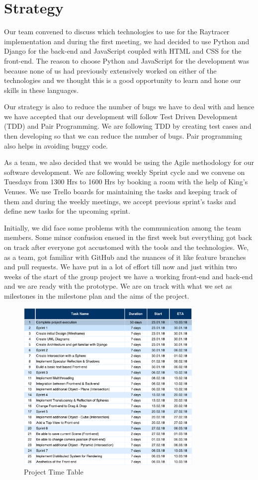 \section{Strategy}
Our team convened to discuss which technologies to use for the Raytracer implementation and during the first meeting, we had decided to use Python and Django for the back-end and JavaScript coupled with HTML and CSS for the front-end. The reason to choose Python and JavaScript for the development was because none of us had previously extensively worked on either of the technologies and we thought this is a good opportunity to learn and hone our skills in these languages. \par
Our strategy is also to reduce the number of bugs we have to deal with and hence we have accepted that our development will follow Test Driven Development (TDD) and Pair Programming. We are following TDD by creating test cases and then developing so that we can reduce the number of bugs. Pair programming also helps in avoiding buggy code. \par
As a team, we also decided that we would be using the Agile methodology for our software development. We are following weekly Sprint cycle and we convene on Tuesdays from 1300 Hrs to 1600 Hrs by booking a room with the help of King's Venues.
We use Trello boards for maintaining the tasks and keeping track of them and during the weekly meetings, we accept previous sprint's tasks and define new tasks for the upcoming sprint.\par
Initially, we did face some problems with the communication among the team members. Some minor confusion ensued in the first week but everything got back on track after everyone got accustomed with the tools and the technologies. We, as a team, got familiar with GitHub and the nuances of it like feature branches and pull requests. We have put in a lot of effort till now and just within two weeks of the start of the group project we have a working front-end and back-end and we are ready with the prototype. We are on track with what we set as milestones in the milestone plan and the aims of the project.

\begin{figure}[htb]
\centering
\includegraphics[width=0.8\textwidth]{images/time_table.pdf} %
\caption{Project Time Table} 
\label{fig:TimeTable} 
\end{figure}